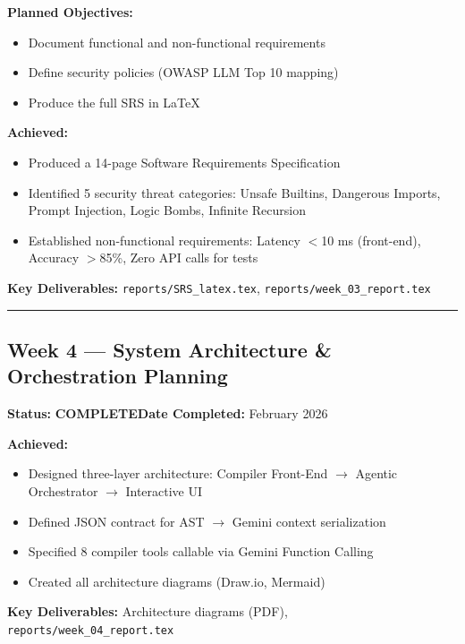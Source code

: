 \documentclass[a4paper,11pt]{article}
\newcommand{\done}{\colorbox{green!25}{\textbf{\small COMPLETE}}}
\begin{document}
\textbf{Planned Objectives:}
\begin{itemize}[leftmargin=*, itemsep=1pt]
    \item Document functional and non-functional requirements
    \item Define security policies (OWASP LLM Top 10 mapping)
    \item Produce the full SRS in LaTeX
\end{itemize}

\textbf{Achieved:}
\begin{itemize}[leftmargin=*, itemsep=1pt]
    \item Produced a 14-page Software Requirements Specification
    \item Identified 5 security threat categories: Unsafe Builtins, Dangerous Imports, Prompt Injection, Logic Bombs, Infinite Recursion
    \item Established non-functional requirements: Latency $<$10 ms (front-end), Accuracy $>$85\%, Zero API calls for tests
\end{itemize}

\textbf{Key Deliverables:} \texttt{reports/SRS\_latex.tex}, \texttt{reports/week\_03\_report.tex}

\vspace{4pt}\hrule\vspace{6pt}

\subsection{Week 4 --- System Architecture \& Orchestration Planning}

\textbf{Status:} \done \hfill \textbf{Date Completed:} February 2026

\textbf{Achieved:}
\begin{itemize}[leftmargin=*, itemsep=1pt]
    \item Designed three-layer architecture: Compiler Front-End $\to$ Agentic Orchestrator $\to$ Interactive UI
    \item Defined JSON contract for AST $\to$ Gemini context serialization
    \item Specified 8 compiler tools callable via Gemini Function Calling
    \item Created all architecture diagrams (Draw.io, Mermaid)
\end{itemize}

\textbf{Key Deliverables:} Architecture diagrams (PDF), \texttt{reports/week\_04\_report.tex}
\end{document}
